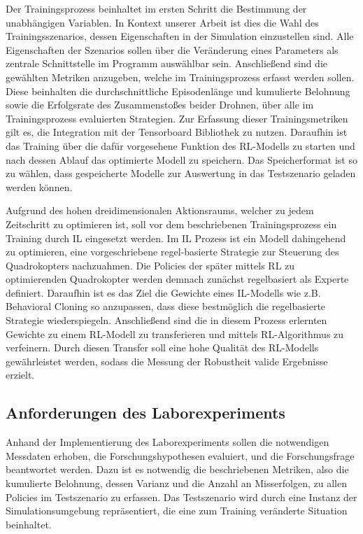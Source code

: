 Der Trainingsprozess beinhaltet im ersten Schritt die Bestimmung der unabhängigen Variablen. 
In Kontext unserer Arbeit ist dies die Wahl des Trainingsszenarios, dessen Eigenschaften in der Simulation einzustellen sind.
Alle Eigenschaften der Szenarios sollen über die Veränderung eines Parameters als zentrale Schnittstelle im Programm auswählbar sein.
Anschließend sind die gewählten Metriken anzugeben, welche im Trainingsprozess erfasst werden sollen.
Diese beinhalten die durchschnittliche Episodenlänge und kumulierte Belohnung sowie die Erfolgsrate des Zusammenstoßes beider Drohnen, über alle im Trainingsprozess evaluierten Strategien.
Zur Erfassung dieser Trainingsmetriken gilt es, die Integration mit der Tensorboard Bibliothek zu nutzen.
Daraufhin ist das Training über die dafür vorgesehene Funktion des RL-Modells zu starten und nach dessen Ablauf das optimierte Modell zu speichern.
Das Speicherformat ist so zu wählen, dass gespeicherte Modelle zur Auswertung in das Testszenario geladen werden können.

Aufgrund des hohen dreidimensionalen Aktionsraums, welcher zu jedem Zeitschritt zu optimieren ist, soll vor dem beschriebenen Trainingsprozess ein Training durch IL eingesetzt werden.
Im IL Prozess ist ein Modell dahingehend zu optimieren, eine vorgeschriebene regel-basierte Strategie zur Steuerung des Quadrokopters nachzuahmen. 
Die Policies der später mittels RL zu optimierenden Quadrokopter werden demnach zunächst regelbasiert als Experte definiert. 
Daraufhin ist es das Ziel die Gewichte eines IL-Modells wie z.B. Behavioral Cloning so anzupassen, dass diese bestmöglich die regelbasierte Strategie wiederspiegeln.
Anschließend sind die in diesem Prozess erlernten Gewichte zu einem RL-Modell zu transferieren und mittels RL-Algorithmus zu verfeinern.
Durch diesen Transfer soll eine hohe Qualität des RL-Modells gewährleistet werden, sodass die Messung der Robustheit valide Ergebnisse erzielt.

\subsection{Anforderungen des Laborexperiments}

Anhand der Implementierung des Laborexperiments sollen die notwendigen Messdaten erhoben, die Forschungshypothesen evaluiert, und die Forschungsfrage beantwortet werden.
Dazu ist es notwendig die beschriebenen Metriken, also die kumulierte Belohnung, dessen Varianz und die Anzahl an Misserfolgen, zu allen Policies im Testszenario zu erfassen.
Das Testszenario wird durch eine Instanz der Simulationsumgebung repräsentiert, die eine zum Training veränderte Situation beinhaltet.

